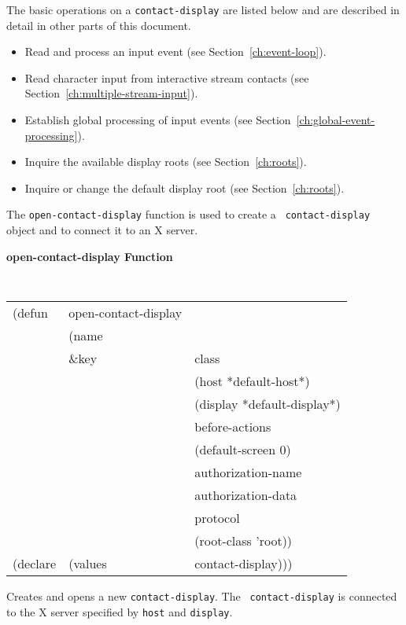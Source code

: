 The basic operations on a {\tt contact-display} are listed below and are
described in detail in other
parts of this document.  
\begin{itemize}
\item Read and process an input event (see Section~\ref{ch:event-loop}).
\item Read character input from interactive stream contacts (see
Section~\ref{ch:multiple-stream-input}).
\item Establish global processing of input events (see
Section~\ref{ch:global-event-processing}).
\item Inquire the available display roots (see Section~\ref{ch:roots}).
\item Inquire or change the default display root (see
Section~\ref{ch:roots}).  
\end{itemize}

The {\tt open-contact-display} function is used to create a {\tt
contact-display} object and to connect it to an X server.

{\large {\bf open-contact-display \hfill Function}} 
\begin{flushright} \parbox[t]{6.125in}{
\tt
\begin{tabular}{lll}
\raggedright
(defun & open-contact-display & \\ 
& (name \\
& \&key &  class\\
& &  (host *default-host*)\\
& &  (display *default-display*)\\
& &  before-actions\\
& &  (default-screen 0)\\
& &  authorization-name\\
& &  authorization-data\\
& &  protocol\\
& &  (root-class 'root))\\
(declare &(values  & contact-display)))
\end{tabular}
\rm
}\end{flushright}

\begin{flushright} \parbox[t]{6.125in}{
Creates and opens a new {\tt contact-display}. 
The {\tt
contact-display} is connected
to the X server
specified by {\tt host} and {\tt display}. 

}\end{flushright}


